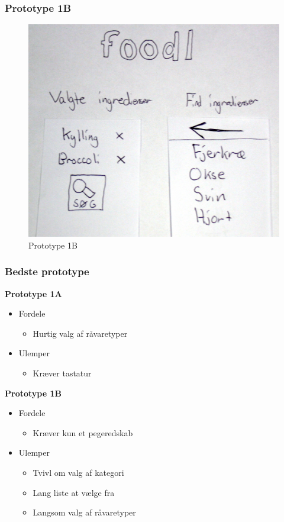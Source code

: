 \begin{frame}
	\frametitle{Prototype 1B}
	\begin{figure}
	\centering
	\includegraphics[scale=0.08]{billeder/prototype1b.jpg}
	\caption{Prototype 1B}
	\end{figure}
\end{frame}

\begin{frame}
\frametitle{Bedste prototype}
	\textbf{Prototype 1A}
			\begin{itemize}
			\item Fordele
				\begin{itemize}
				\item Hurtig valg af råvaretyper
				\end{itemize}
			\item Ulemper
				\begin{itemize}
				\item Kræver tastatur
				\end{itemize}
			\end{itemize}
	\textbf{Prototype 1B}
			\begin{itemize}
			\item Fordele
				\begin{itemize}
				\item Kræver kun et pegeredskab
				\end{itemize}
			\item Ulemper
				\begin{itemize}
				\item Tvivl om valg af kategori
				\item Lang liste at vælge fra
				\item Langsom valg af råvaretyper
				\end{itemize}
			\end{itemize} 	
\end{frame}

